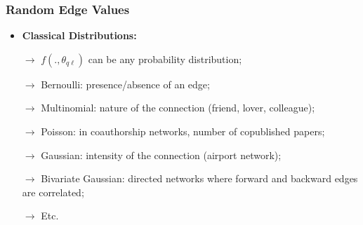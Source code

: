 \documentclass{beamer}
\begin{document}
\begin{frame}
  \frametitle{Random Edge Values}
  \begin{itemize}
  \item \textbf{Classical Distributions:}
  \item[\bf{$\rightarrow$}] $f(.,\theta_{q\ell})$ can be \alert{any}
    probability distribution;\medskip
    \pause
  \item[\bf{$\rightarrow$}] Bernoulli: presence/absence of an
    edge;\medskip
    \pause
  \item[\bf{$\rightarrow$}] Multinomial: nature of the connection
    (friend, lover, colleague); \medskip
    \pause
  \item[\bf{$\rightarrow$}] Poisson: in coauthorship networks, number
    of copublished papers; \medskip
    \pause
  \item[\bf{$\rightarrow$}] Gaussian: intensity of the connection
    (airport network); \medskip
    \pause
  \item[\bf{$\rightarrow$}] Bivariate Gaussian: directed networks where
    forward and backward edges are correlated; \medskip
    \pause
  \item[\bf{$\rightarrow$}] Etc.
  \end{itemize}

  \pause
  \begin{center}
  \end{center}
\end{frame}
\end{document}
